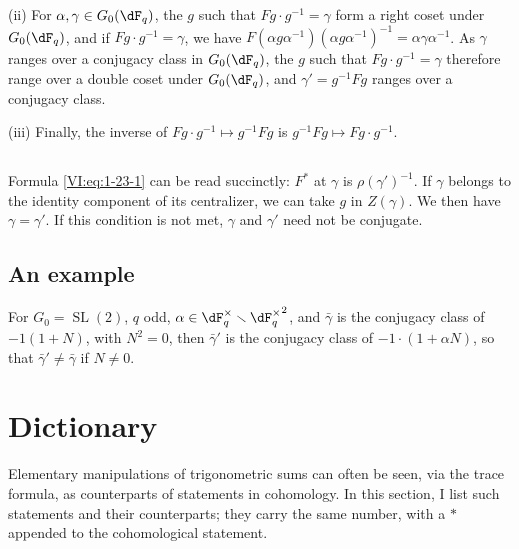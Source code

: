 (ii) For $\alpha,\gamma\in G_0(\dF_q)$, the $g$ such that 
$F g\cdot g^{-1} = \gamma$ form a right coset under $G_0(\dF_q)$, and 
if $F g\cdot g^{-1} = \gamma$, we have 
$F(\alpha g \alpha^{-1})(\alpha g \alpha^{-1})^{-1} = \alpha \gamma\alpha^{-1}$. 
As $\gamma$ ranges over a conjugacy class in $G_0(\dF_q)$, the $g$ 
such that $F g\cdot g^{-1} = \gamma$ therefore range over a double coset under 
$G_0(\dF_q)$, and $\gamma'= g^{-1} F g$ ranges over a conjugacy class. 

(iii) Finally, the inverse of $F g\cdot g^{-1}\mapsto g^{-1} F g$ is 
$g^{-1} F g\mapsto F g\cdot g^{-1}$. 





\subsection{}\label{VI:1-25}

Formula \eqref{VI:eq:1-23-1} can be read succinctly: $F^\ast$ at 
$\gamma$ is $\rho(\gamma')^{-1}$. If $\gamma$ belongs to the identity component 
of its centralizer, we can take $g$ in $Z(\gamma)$. We then have 
$\gamma=\gamma'$. If this condition is not met, $\gamma$ and $\gamma'$ 
need not be conjugate. 





\subsection{An example}\label{VI:1-26}

For $G_0=\operatorname{SL}(2)$, $q$ odd, 
$\alpha\in \dF_q^\times\setminus {\dF_q^\times}^2$, and $\bar\gamma$ is the 
conjugacy class of $-1(1+N)$, with $N^2=0$, then $\bar\gamma'$ is the 
conjugacy class of $-1\cdot (1+\alpha N)$, so that $\bar\gamma'\ne \bar\gamma$ 
if $N\ne 0$. 










\section{Dictionary}\label{VI:2}

Elementary manipulations of trigonometric sums can often 
be seen, via the trace formula, as counterparts of statements 
in cohomology. In this section, I list such statements and their 
counterparts; they carry the same number, with a $\ast$ appended to 
the cohomological statement. 





